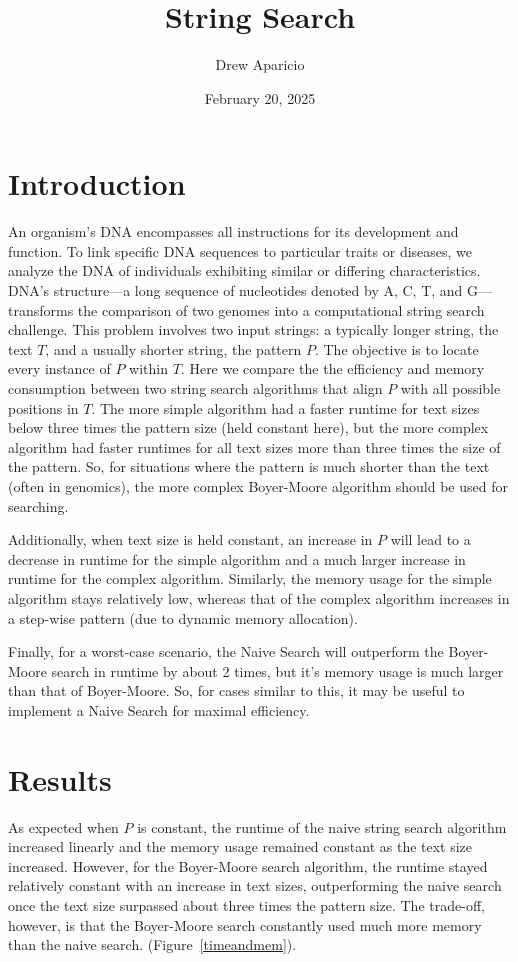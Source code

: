 \documentclass[11pt, letterpaper]{article}
\begin{document}
\title{String Search}
\author{Drew Aparicio}
\date{February 20, 2025}
\maketitle

\section{Introduction}
An organism's DNA encompasses all instructions for its development and
function. To link specific DNA sequences to particular traits or diseases, we
analyze the DNA of individuals exhibiting similar or differing characteristics.
DNA's structure—a long sequence of nucleotides denoted by A, C, T, and
G—transforms the comparison of two genomes into a computational string search
challenge. This problem involves two input strings: a typically longer string,
the text $T$, and a usually shorter string, the pattern $P$. The
objective is to locate every instance of $P$ within $T$. Here we compare the
the efficiency and memory consumption between two string search algorithms that
align $P$ with all possible positions in $T$. The more simple algorithm had a faster runtime for text sizes below three times the pattern size (held constant here), but the more complex algorithm had faster runtimes for all text sizes more than three times the size of the pattern. So, for situations where the pattern is much shorter than the text (often in genomics), the more complex Boyer-Moore algorithm should be used for searching. 

Additionally, when text size is held constant, an increase in $P$ will lead to a decrease in runtime for the simple algorithm and a much larger increase in runtime for the complex algorithm. Similarly, the memory usage for the simple algorithm stays relatively low, whereas that of the complex algorithm increases in a step-wise pattern (due to dynamic memory allocation).

Finally, for a worst-case scenario, the Naive Search will outperform the Boyer-Moore search in runtime by about 2 times, but it's memory usage is much larger than that of Boyer-Moore. So, for cases similar to this, it may be useful to implement a Naive Search for maximal efficiency.

\section{Results}

As expected when $P$ is constant, the runtime of the naive string search algorithm increased
linearly and the memory usage remained constant as the text size increased. However, for the Boyer-Moore search algorithm, the runtime stayed relatively constant with an increase in text sizes, outperforming the naive search once the text size surpassed about three times the pattern size. The trade-off, however, is that the Boyer-Moore search constantly used much more memory than the naive search.
(Figure~\ref{timeandmem}). 
\end{document}

